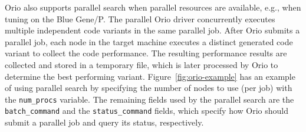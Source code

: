 Orio also supports parallel search when parallel resources are
available, e.g., when tuning on the Blue Gene/P. The parallel Orio
driver concurrently executes multiple independent code variants in the
same parallel job. After Orio submits a parallel job, each node in the
target machine executes a distinct generated code variant to collect
the code performance. The resulting performance results are collected
and stored in a temporary file, which is later processed by Orio to
determine the best performing variant.  Figure~\ref{fig:orio-example}
has an example of using parallel search by specifying the number of
nodes to use (per job) with the \texttt{num\_procs} variable. The
remaining fields used by the parallel search are the
\texttt{batch\_command} and the \texttt{status\_command} fields, which
specify how Orio should submit a parallel job and query its status,
respectively.

